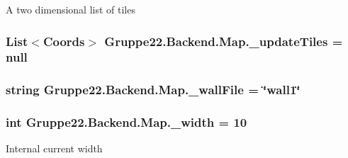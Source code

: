 A two dimensional list of tiles 

\hypertarget{class_gruppe22_1_1_backend_1_1_map_a1c8b19d3884fe44b1714ebec0256ce2a}{
\subsubsection[{\-\_\-update\-Tiles}]{\setlength{\rightskip}{0pt plus 5cm}List$<${\bf Coords}$>$ Gruppe22.\-Backend.\-Map.\-\_\-update\-Tiles = null\hspace{0.3cm}{\ttfamily [protected]}}}\label{class_gruppe22_1_1_backend_1_1_map_a1c8b19d3884fe44b1714ebec0256ce2a}
\hypertarget{class_gruppe22_1_1_backend_1_1_map_aa963f4d1f06aa5722e961a7674828910}{
\subsubsection[{\-\_\-wall\-File}]{\setlength{\rightskip}{0pt plus 5cm}string Gruppe22.\-Backend.\-Map.\-\_\-wall\-File = \char`\"{}wall1\char`\"{}\hspace{0.3cm}{\ttfamily [protected]}}}\label{class_gruppe22_1_1_backend_1_1_map_aa963f4d1f06aa5722e961a7674828910}
\hypertarget{class_gruppe22_1_1_backend_1_1_map_a18b255b6ba29200aa83cd246ae8e3427}{
\subsubsection[{\-\_\-width}]{\setlength{\rightskip}{0pt plus 5cm}int Gruppe22.\-Backend.\-Map.\-\_\-width = 10\hspace{0.3cm}{\ttfamily [protected]}}}\label{class_gruppe22_1_1_backend_1_1_map_a18b255b6ba29200aa83cd246ae8e3427}


Internal current width 



